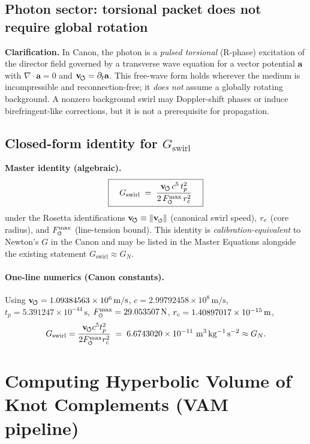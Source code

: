 \subsection{Photon sector: torsional packet does not require global rotation \statusCanonical}
\textbf{Clarification.}
In Canon, the photon is a \emph{pulsed torsional} (R-phase) excitation of the director field governed by a transverse wave equation for a vector potential \(\mathbf a\) with \(\nabla\!\cdot\!\mathbf a=0\) and \(\mathbf{v}_{\!\boldsymbol{\circlearrowleft}}=\partial_t\mathbf a\). This free-wave form holds wherever the medium is incompressible and reconnection-free; it \emph{does not} assume a globally rotating background. A nonzero background swirl may Doppler-shift phases or induce birefringent-like corrections, but it is not a prerequisite for propagation.

\subsection{Closed-form identity for \(G_{\text{swirl}}\) \statusCalibration}
\textbf{Master identity (algebraic).}
\[
    \boxed{\quad
    G_{\text{swirl}}
        \;=\;
        \frac{\mathbf{v}_{\!\boldsymbol{\circlearrowleft}}\,c^{5}\,t_p^{2}}{2\,F^{\max}_{\mkern-1mu\scriptscriptstyle\boldsymbol{\circlearrowleft}}\,r_c^{2}}
        \quad}
\]
under the Rosetta identifications \(\mathbf{v}_{\!\boldsymbol{\circlearrowleft}}\equiv \lVert \mathbf{v}_{\mkern-2mu\scriptscriptstyle\boldsymbol{\circlearrowleft}} \rVert\) (canonical swirl speed), \(r_c\) (core radius), and \(F^{\max}_{\mkern-1mu\scriptscriptstyle\boldsymbol{\circlearrowleft}}\) (line-tension bound). This identity is \emph{calibration-equivalent} to Newton’s \(G\) in the Canon and may be listed in the Master Equations alongside the existing statement \(G_{\text{swirl}}\approx G_N\).

\paragraph{One-line numerics (Canon constants).}
    Using
    \(\mathbf{v}_{\!\boldsymbol{\circlearrowleft}}=1.09384563\times10^{6}\,\mathrm{m/s}\),
    \(c=2.99792458\times10^{8}\,\mathrm{m/s}\),
    \(t_p=5.391247\times10^{-44}\,\mathrm{s}\),
    \(F^{\max}_{\mkern-1mu\scriptscriptstyle\boldsymbol{\circlearrowleft}}=29.053507\,\mathrm{N}\),
    \(r_c=1.40897017\times10^{-15}\,\mathrm{m}\),
    \[
        G_{\text{swirl}}
        =\frac{\mathbf{v}_{\!\boldsymbol{\circlearrowleft}} c^5 t_p^2}{2F^{\max}_{\mkern-1mu\scriptscriptstyle\boldsymbol{\circlearrowleft}} r_c^2}
        \;=\;6.6743020\times10^{-11}\ \mathrm{m^3\,kg^{-1}\,s^{-2}}
        \approx G_N.
    \]


\section{Computing Hyperbolic Volume of Knot Complements (VAM pipeline)}

